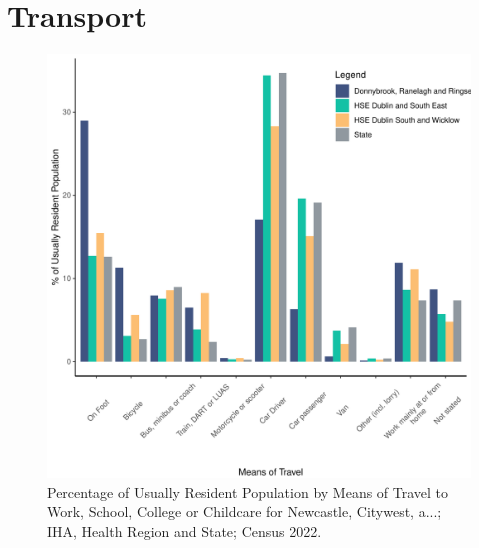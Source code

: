 \documentclass{article}
\begin{document}
\section{Transport}\label{sect:Trans}
\begin{figure}[H]
	\centering
	\includegraphics[width = 120mm]{../figures/TravelED.pdf}
	\caption{Percentage of Usually Resident Population by Means of Travel to Work, School, College or Childcare for Newcastle, Citywest, a...; IHA, Health Region and State; Census 2022.}
	\label{fig:vbnv}
	\end{figure}
\end{document}
